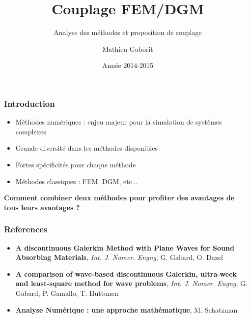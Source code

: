 \documentclass[10pt, compress]{beamer}
\title{Couplage FEM/DGM}
\subtitle{Analyse des méthodes et proposition de couplage}
\date{Année 2014-2015}
\author{Mathieu Gaborit}
\institute{Université du Maine}
\begin{document}
\maketitle

\begin{frame}[fragile]
    \frametitle{Introduction}

    \begin{itemize}
        \item Méthodes numériques : enjeu majeur pour la simulation de systèmes complexes
        \item Grande diversité dans les méthodes disponibles
        \item Fortes spécificités pour chaque méthode
        \item Méthodes classiques : FEM, DGM, etc...
    \end{itemize}

    \pause
    \begin{center}
        \alert{\textbf{Comment combiner deux méthodes pour profiter des avantages de tous leurs avantages ?}}
    \end{center}
\end{frame}

\begin{frame}
    \frametitle{References}

    \begin{itemize}
        \item \textbf{A discontinuous Galerkin Method with Plane Waves for Sound Absorbing Materials}, \textit{Int. J.
            Numer. Engng}, G. Gabard, O.  Dazel
        \item \textbf{A comparison of wave-based discontinuous Galerkin, ultra-week and least-square method for wave
            problems}, \textit{Int. J.
            Numer. Engng}, G. Gabard, P. Gamallo, T. Huttunen
        \item \textbf{Analyse Numérique : une approche mathématique}, M. Schatzman
    \end{itemize}
\end{frame}
\end{document}

